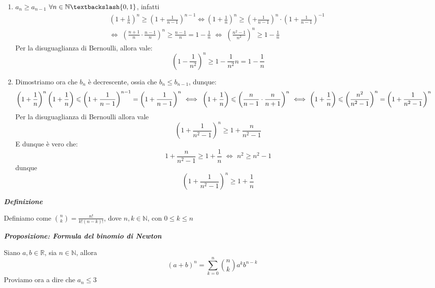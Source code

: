 \documentclass{article}
\theoremstyle{definition}
\newcommand{\R}{\mathbb{R}}
\newcommand{\N}{\mathbb{N}}
\begin{document}
\begin{enumerate}
    \item $a_n \geqslant a_{n-1}$ $\forall n \in \N \textbackslash \{0,1\}$, infatti
    \begin{align*}
        \left(1+\frac{1}{n}\right)^n \geqslant \left(1+\frac{1}{n-1}\right)^{n-1} \Longleftrightarrow \left(1+\frac{1}{n}\right)^n \geqslant \left(+\frac{1}{n-1}\right)^n \cdot \left(1+\frac{1}{n-1}\right)^{-1} \,\, \\
        \Longleftrightarrow \,\, \left(\frac{n+1}{n} \cdot \frac{n-1}{n}\right)^n \geqslant \frac{n-1}{n}=1-\frac{1}{n} \,\, \Longleftrightarrow \,\, \left(\frac{n^2-1}{n^2}\right)^n \geqslant 1-\frac{1}{n}
    \end{align*}
    Per la disuguaglianza di Bernoulli, allora vale:
    \begin{equation}
        \left(1-\frac{1}{n^2}\right)^n \geqslant 1-\frac{1}{n^2}n=1-\frac{1}{n}
    \end{equation}
    \item Dimostriamo ora che $b_n$ è decrescente, ossia che $b_n \leqslant b_{n-1}$, dunque:
    \begin{equation}
        \left(1+\frac{1}{n}\right)^n\left(1+\frac{1}{n}\right) \leqslant \left(1+\frac{1}{n-1}\right)^{n-1}=\left(1+\frac{1}{n-1}\right)^n \,\, \Longleftrightarrow \\
        \,\, \left(1+\frac{1}{n}\right) \leqslant \left(\frac{n}{n-1} \cdot \frac{n}{n+1}\right)^n \,\, \Longleftrightarrow \,\, \left(1+\frac{1}{n}\right) \leqslant \left(\frac{n^2}{n^2-1}\right)^n=\left(1+\frac{1}{n^2-1}\right)^n
    \end{equation}
    Per la disuguaglianza di Bernoulli allora vale
    \begin{equation}
        \left(1+\frac{1}{n^2-1}\right)^n \geqslant 1+\frac{n}{n^2-1}
    \end{equation}
    E dunque è vero che: \begin{equation}
        1+\frac{n}{n^2-1} \geqslant 1 + \frac{1}{n} \,\, \Longleftrightarrow \,\, n^2 \geqslant n^2-1
    \end{equation}
    dunque
    \begin{equation*}
        \left(1+\frac{1}{n^2-1}\right)^n \geqslant 1+\frac{1}{n}
    \end{equation*}
\end{enumerate}
\newpage
\begin{center}
    \textbf{\textit{Definizione}}
\end{center}
Definiamo come $\binom{n}{k}=\frac{n!}{k!(n-k)!}$, dove $n,k \in \N$, con $0 \leqslant k \leqslant n$
\begin{center}
    \textbf{\textit{Proposizione: Formula del binomio di Newton}}
\end{center}
Siano $a,b \in \R$, sia $n \in \N$, allora
\begin{equation}
    (a+b)^n=\sum_{k=0}^n \binom{n}{k}a^k b^{n-k}
\end{equation}
Proviamo ora a dire che $a_n \leqslant 3$
\end{document}
